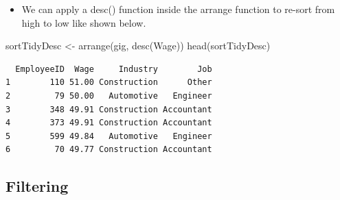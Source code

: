 \documentclass[
  letterpaper,
  DIV=11,
  numbers=noendperiod]{scrreprt}
\newenvironment{Shaded}{\begin{snugshade}}{\end{snugshade}}
\newcommand{\FunctionTok}[1]{\textcolor[rgb]{0.28,0.35,0.67}{#1}}
\newcommand{\NormalTok}[1]{\textcolor[rgb]{0.00,0.23,0.31}{#1}}
\newcommand{\OtherTok}[1]{\textcolor[rgb]{0.00,0.23,0.31}{#1}}
\providecommand{\tightlist}{%
  \setlength{\itemsep}{0pt}\setlength{\parskip}{0pt}}\usepackage{longtable,booktabs,array}
\begin{document}
\begin{itemize}
\tightlist
\item
  We can apply a desc() function inside the arrange function to re-sort
  from high to low like shown below.
\end{itemize}

\begin{Shaded}
\begin{Highlighting}[]
\NormalTok{sortTidyDesc }\OtherTok{\textless{}{-}} \FunctionTok{arrange}\NormalTok{(gig, }\FunctionTok{desc}\NormalTok{(Wage))}
\FunctionTok{head}\NormalTok{(sortTidyDesc)}
\end{Highlighting}
\end{Shaded}

\begin{verbatim}
  EmployeeID  Wage     Industry        Job
1        110 51.00 Construction      Other
2         79 50.00   Automotive   Engineer
3        348 49.91 Construction Accountant
4        373 49.91 Construction Accountant
5        599 49.84   Automotive   Engineer
6         70 49.77 Construction Accountant
\end{verbatim}

\subsection{Filtering}\label{filtering}
\end{document}
